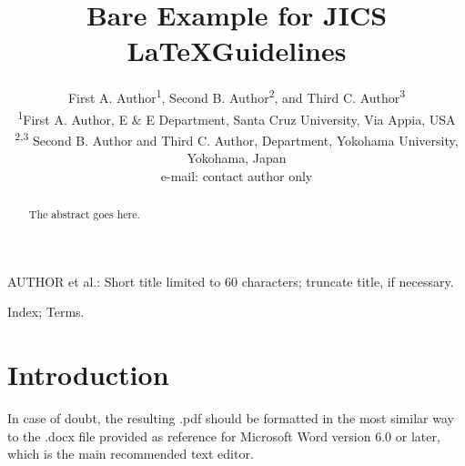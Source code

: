 \documentclass[a4paper,10pt,twoside,twocolumn,final]{JICS_LaTexGuidelines} %
\begin{document}
\title{Bare Example for JICS \LaTeX Guidelines} %
\author{First A. Author\textsuperscript1, Second B. Author\textsuperscript2, and Third C. Author\textsuperscript3\\\vspace{1.2em}\small\textsuperscript1First A. Author, E \& E Department, Santa Cruz University, Via Appia, USA\\\textsuperscript{2,3} Second B. Author and Third C. Author, Department, Yokohama University, Yokohama, Japan\\ e-mail: contact author only
} %
%
%
{AUTHOR et al.: Short title limited to 60 characters; truncate title, if necessary.}%
\renewcommand*\footnoterule{}%
%
\maketitle
\begin{abstract}
	The abstract goes here.
\end{abstract}  %
\begin{indexterms}
	Index; Terms.
\end{indexterms} %
\section{Introduction}
	In case of doubt, the resulting .pdf should be formatted in the most similar way to the .docx file provided as reference for Microsoft Word version 6.0 or later, which is the main recommended text editor.
	
\end{document}
